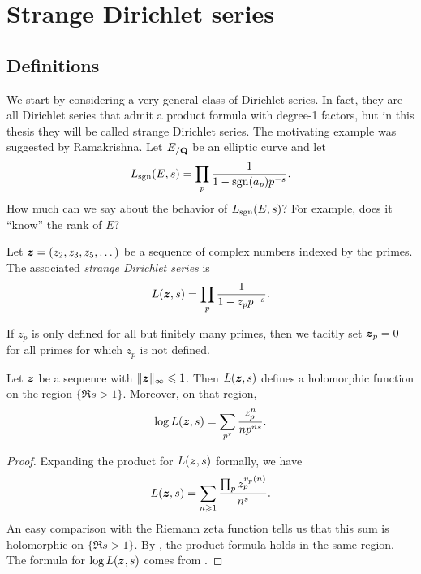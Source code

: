 
\chapter{Strange Dirichlet series}





\section{Definitions}

We start by considering a very general class of Dirichlet series. In fact, they 
are all Dirichlet series that admit a product formula with degree-1 factors, 
but in this thesis they will be called strange Dirichlet series. The motivating 
example was suggested by Ramakrishna. Let $E_{/\mathbf{Q}}$ be an elliptic curve and 
let 
\[
	L_{\operatorname{sgn}}(E,s) = \prod_p \frac{1}{1-\operatorname{sgn}(a_p) p^{-s}} .
\]
How much can we say about the behavior of $L_{\operatorname{sgn}}(E,s)$? For example, does it 
``know'' the rank of $E$?

\begin{definition}
Let ${\boldsymbol z}=(z_2,z_3,z_5,\dots)$ be a sequence of complex numbers indexed by the 
primes. The associated \emph{strange Dirichlet series} is 
\[
	L({\boldsymbol z},s) = \prod_p \frac{1}{1- z_p p^{-s}} .
\]
\end{definition}

If $z_p$ is only defined for all but finitely many primes, then we tacitly set 
${\boldsymbol z}_p = 0$ for all primes for which $z_p$ is not defined. 

\begin{lemma}
Let ${\boldsymbol z}$ be a sequence with $\|{\boldsymbol z}\|_\infty \leqslant 1$. Then $L({\boldsymbol z},s)$ 
defines a holomorphic function on the region $\{\Re s>1\}$. Moreover, on that 
region, 
\[
	\log L({\boldsymbol z},s) = \sum_{p^r} \frac{z_p^n}{n p^{n s}} .
\]
\end{lemma}
\begin{proof}
Expanding the product for $L({\boldsymbol z},s)$ formally, we have 
\[
	L({\boldsymbol z},s) = \sum_{n\geqslant 1} \frac{\prod_p z_p^{v_p(n)}}{n^s} .
\]
An easy comparison with the Riemann zeta function tells us that this sum 
is holomorphic on $\{\Re s>1\}$. By \cite[Th.~11.7]{apostol-1976}, the 
product formula holds in the same region. The formula for $\log L({\boldsymbol z},s)$ 
comes from \cite[11.9 Ex.2]{apostol-1976}. 
\end{proof}

